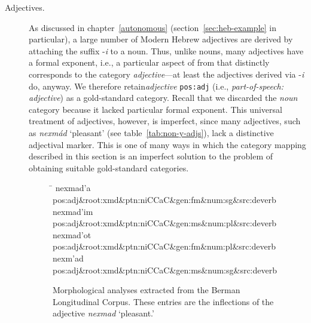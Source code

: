 \begin{description}
\item[Adjectives.]
As discussed in chapter~\ref{autonomous} (section~\ref{sec:heb-example} in particular), 
a large number of Modern Hebrew adjectives are derived by attaching the 
suffix -\textit{i}
to a noun. Thus, unlike nouns, many adjectives have a formal exponent, i.e., a particular aspect of from that distinctly corresponds to the category \emph{adjective}---at least the adjectives derived via -\textit{i} do, anyway. 
We therefore retain\emph{adjective} 
\texttt{pos:adj} (i.e., \textit{part-of-speech: adjective}) as a gold-standard category.
Recall that we discarded the \emph{noun} category because it lacked particular formal exponent. 
This universal treatment of adjectives, however, is imperfect, since many adjectives, such as
\textit{nexm\'{a}d} `pleasant' (see table~\ref{tab:non-y-adjs}),
lack a distinctive adjectival marker.  This is one of many ways in which the category mapping described in this section is an imperfect solution to the problem of obtaining suitable gold-standard categories.  
 
\begin{figure}[t]
\begin{mdframed}
\begin{tabbing}
\hspace{1in} \= \hspace{5.5in} \kill
nexmad\a'{a} \> pos:adj\&root:xmd\&ptn:niCCaC\&gen:fm\&num:sg\&src:deverb\\
nexmad\a'{i}m \> pos:adj\&root:xmd\&ptn:niCCaC\&gen:ms\&num:pl\&src:deverb\\
nexmad\a'{o}t \> pos:adj\&root:xmd\&ptn:niCCaC\&gen:fm\&num:pl\&src:deverb\\
nexm\a'{a}d \> pos:adj\&root:xmd\&ptn:niCCaC\&gen:ms\&num:sg\&src:deverb\\
\end{tabbing}
\label{fig:analyses}
\caption{Morphological analyses extracted from the Berman Longitudinal Corpus. These entries are the inflections
of the adjective \textit{nexmad} `pleasant.'}
\end{mdframed}
\end{figure}


\end{description}

